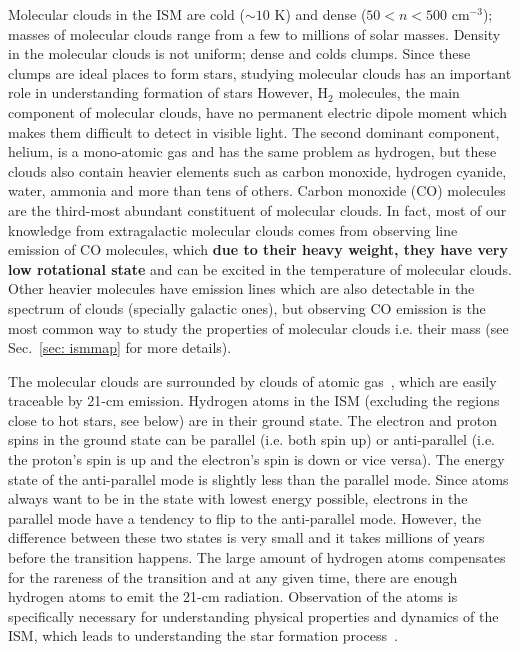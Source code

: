 Molecular clouds in the ISM are cold ($\sim10$ K) and dense ($ 50<n<500$ cm$^{-3}$); masses of molecular clouds range from a few to millions of solar masses. %
Density in the molecular clouds is not uniform; dense and colds clumps. %
Since these clumps are ideal places to form stars, studying molecular clouds has an important role in understanding formation of stars
However, H$_2$ molecules, the main component of molecular clouds, have no permanent electric dipole moment which makes them difficult to detect in visible light. %
The second dominant component, helium, is a mono-atomic gas and has the same problem as hydrogen, but these clouds also contain heavier elements such as carbon monoxide, hydrogen cyanide, water, ammonia and more than tens of others.
Carbon monoxide (CO) molecules are the third-most abundant constituent of molecular clouds.
In fact, most of our knowledge from extragalactic molecular clouds comes from observing line emission of CO molecules, which {\bf due to their heavy weight, they have very low rotational state} and can be excited in the temperature of molecular clouds. %
Other heavier molecules have emission lines which are also detectable in the spectrum of clouds (specially galactic ones), but observing CO emission is the most common way to study the properties of molecular clouds i.e. their mass (see Sec.~\ref{sec: ismmap} for more details).

The molecular clouds are surrounded by clouds of atomic gas~\citep{Kennicutt12}, which are easily traceable by 21-cm emission.
Hydrogen atoms in the ISM (excluding the regions close to hot stars, see below) are in their ground state. 
The electron and proton spins in the ground state can be parallel (i.e. both spin up) or anti-parallel (i.e. the proton's spin is up and the electron's spin is down or vice versa). 
The energy state of the anti-parallel mode is slightly less than the parallel mode.
Since atoms always want to be in the state with lowest energy possible, electrons in the parallel mode have a tendency to flip to the anti-parallel mode. 
However, the difference between these two states is very small and it takes millions of years before the transition happens.
The large amount of hydrogen atoms compensates for the rareness of the transition and at any given time, there are enough hydrogen atoms to emit the 21-cm radiation. 
Observation of the \hi atoms is specifically necessary for understanding physical properties and dynamics of the ISM, which leads to understanding the star formation process~\citep{Walter08}.

